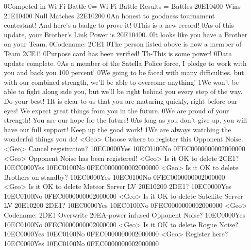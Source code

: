 0Competed in Wi-Fi Battle 
0= Wi-Fi Battle Results = Battles {20}{E1}{04}{00} Wins {21}{E1}{04}{00} Null Matches {22}{E1}{02}{00} 
0An honest to goodness tournament contestant! 
And here's a badge to prove it! 
0This is a new record! 
0As of this update, your Brother's Link Power is {20}{E1}{04}{00}. 
0It looks like you have a Brother on your Team. 
0Codename: {2C}{E1} 
0The person listed above is now a member of Team {2C}{E1}! 
0Purpose card has been verified! Th-This is some power! 
0Data update complete. 
0As a member of the Satella Police force, I pledge to work with you 
and back you 100 percent! 
0We going to be faced with many difficulties, but with our combined strength, 
we'll be able to overcome anything! 
1We won't be able to fight along side you, but we'll be 
right behind you every step of the way. 
Do your best! 
1It is clear to us that you are maturing quickly, right before our eyes! 
We expect great things from you in the future. 
0We are proud of your strength! You are our hope for the future! 
0As long as you don't give up, you will have our full support! 
Keep up the good work! 
1We are always watching the wonderful things you do! 
<Geo> Choose where to register this Opponent Noise. 
<Geo> Cancel registration? {10}{EC}{00}{00}Yes {10}{EC}{01}{00}No {0F}{EC}{00}{00}{00}{00}{02}{00}{00}{00}
<Geo> Opponent Noise has been registered! 
<Geo> Is it OK to delete {2C}{E1}? {10}{EC}{00}{00}Yes {10}{EC}{01}{00}No {0F}{EC}{00}{00}{00}{00}{02}{00}{00}{00}
<Geo> Is it OK to delete Brothers on standby? {10}{EC}{00}{00}Yes {10}{EC}{01}{00}No {0F}{EC}{00}{00}{00}{00}{02}{00}{00}{00}
<Geo> Is it OK to delete Meteor Server LV {20}{E1}{02}{00} {2D}{E1}? {10}{EC}{00}{00}Yes {10}{EC}{01}{00}No {0F}{EC}{00}{00}{00}{00}{02}{00}{00}{00}
<Geo> Is it OK to delete Satellite Server LV {20}{E1}{02}{00} {2D}{E1}? {10}{EC}{00}{00}Yes {10}{EC}{01}{00}No {0F}{EC}{00}{00}{00}{00}{02}{00}{00}{00}
<Geo> Codename: {2D}{E1} Overwrite {20}{EA}-power infused Opponent Noise? {10}{EC}{00}{00}Yes {10}{EC}{01}{00}No {0F}{EC}{00}{00}{00}{00}{02}{00}{00}{00}
<Geo> Is it OK to delete Rogue Noise? {10}{EC}{00}{00}Yes {10}{EC}{01}{00}No {0F}{EC}{00}{00}{00}{00}{02}{00}{00}{00}
<Geo> Register here? {10}{EC}{00}{00}Yes {10}{EC}{01}{00}No {0F}{EC}{00}{00}{00}{00}{02}{00}{00}{00}
